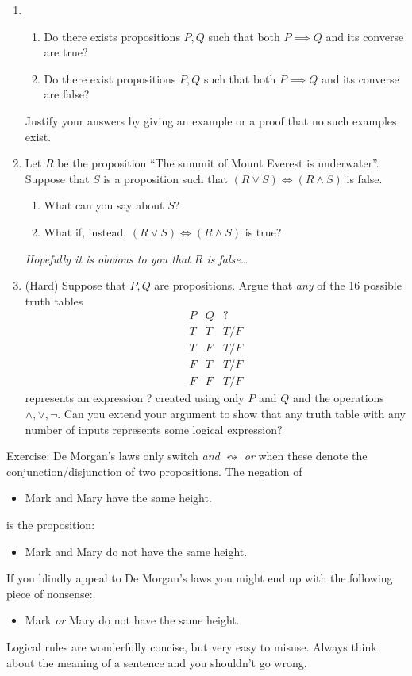 \begin{exercises}{}{}
\begin{enumerate}
  \item\begin{enumerate}
    	\item Do there exists propositions $P,Q$ such that both $P\implies Q$ and its converse are true?
    	\item Do there exist propositions $P,Q$ such that both $P\implies Q$ and its converse are false?
    \end{enumerate}
    Justify your answers by giving an example or a proof that no such examples exist.
    
  \item Let $R$ be the proposition ``The summit of Mount Everest is underwater''. Suppose that $S$ is a proposition such that $(R\vee S)\iff (R\wedge S)$ is false.
    \begin{enumerate}
      \item What can you say about $S$?
      \item What if, instead, $(R\vee S)\iff (R\wedge S)$ is true?
    \end{enumerate}
    \emph{Hopefully it is obvious to you that $R$ is false\ldots}
    
	\item (Hard) Suppose that $P,Q$ are propositions. Argue that \emph{any} of the 16 possible truth tables
	\[\begin{array}{cc|c}
	P&Q&?\\\hline
	T&T & T/F\\
	T&F & T/F\\
	F&T & T/F\\
	F&F & T/F
	\end{array}\]
	represents an expression ? created using only $P$ and $Q$ and the operations $\wedge,\vee,\neg$. Can you extend your argument to show that any truth table with any number of inputs represents some logical expression?
\end{enumerate}

\end{exercises}


Exercise: De Morgan's laws only switch \emph{and} $\leftrightsquigarrow$ \emph{or} when these denote the conjunction/disjunction of two propositions. The negation of
\begin{itemize}\setlength{\itemsep}{0pt}
  \item[] Mark and Mary have the same height.
\end{itemize}
is the proposition:
\begin{itemize}\setlength{\itemsep}{0pt}
  \item[] Mark and Mary do not have the same height.
\end{itemize}
If you blindly appeal to De Morgan's laws you might end up with the following piece of nonsense:
\begin{itemize}\setlength{\itemsep}{0pt}
  \item[] Mark \emph{or} Mary do not have the same height.
\end{itemize}
Logical rules are wonderfully concise, but very easy to misuse. Always think about the meaning of a sentence and you shouldn't go wrong.


